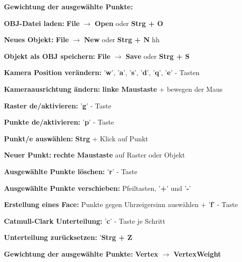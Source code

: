 	\begin{labeling}[]{\textbf{Gewichtung der ausgewählte Punkte:}}%
		\item [\textbf{OBJ-Datei laden:}] \textbf{File} $\rightarrow$ \textbf{Open} oder \textbf{Strg + O}
		\item [\textbf{Neues Objekt:}] \textbf{File} $\rightarrow$ \textbf{New} oder \textbf{Strg + N}
hh		\item [\textbf{Objekt als OBJ speichern:}] \textbf{File} $\rightarrow$ \textbf{Save} oder \textbf{Strg + S}
		\newline
		\item [\textbf{Kamera Position verändern:}] '\textbf{w}',  '\textbf{a}', '\textbf{s}', '\textbf{d}', '\textbf{q}', '\textbf{e}' - Tasten
		\item [\textbf{Kameraausrichtung ändern:}] \textbf{linke Maustaste} + bewegen der Maus
		\newline
		\item [\textbf{Raster de/aktivieren:}] '\textbf{g}' - Taste
		\item [\textbf{Punkte de/aktivieren:}] '\textbf{p}' - Taste
		\newline
		\item [\textbf{Punkt/e auswählen:}] \textbf{Strg} + Klick auf Punkt
		\item [\textbf{Neuer Punkt:}] \textbf{rechte Maustaste} auf Raster oder Objekt
		\item [\textbf{Ausgewählte Punkte löschen:}] '\textbf{r}' - Taste
		\item [\textbf{Ausgewählte Punkte verschieben:}] Pfeiltasten, '\textbf{+}' und  '\textbf{-}'
		\newline
		\item [\textbf{Erstellung eines Face:}] Punkte gegen Uhrzeigersinn auswählen +  '\textbf{f}' - Taste
		\newline
		\item [\textbf{Catmull-Clark Unterteilung:}]  '\textbf{c}' - Taste je Schritt
		\item [\textbf{Unterteilung zurücksetzen:}] '\textbf{Strg + Z}
		\newline
		\item [\textbf{Gewichtung der ausgewählte Punkte:}] \textbf{Vertex} $\rightarrow$ \textbf{VertexWeight}
	\end{labeling}
		
